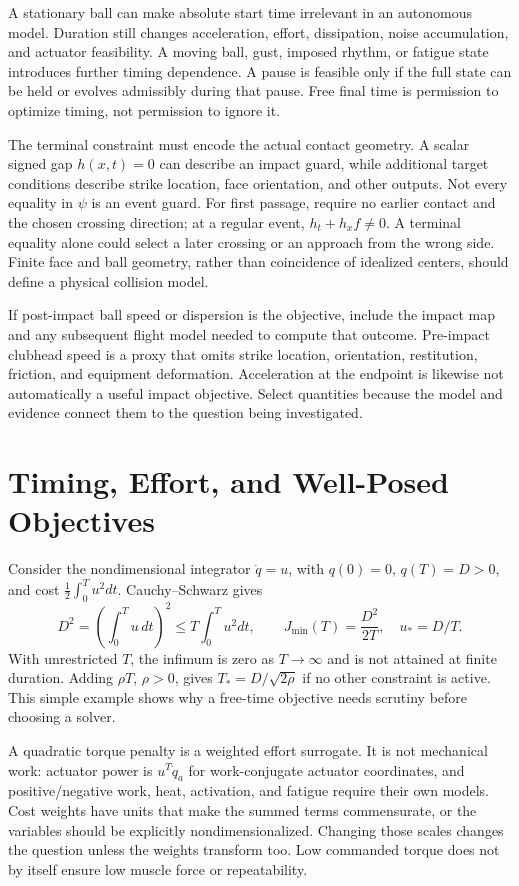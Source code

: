 \documentclass[12pt, openany]{book}
\theoremstyle{plain}
\begin{document}
A stationary ball can make absolute start time irrelevant in an autonomous
model. Duration still changes acceleration, effort, dissipation, noise
accumulation, and actuator feasibility. A moving ball, gust, imposed rhythm,
or fatigue state introduces further timing dependence. A pause is feasible
only if the full state can be held or evolves admissibly during that pause.
Free final time is permission to optimize timing, not permission to ignore it.

The terminal constraint must encode the actual contact geometry. A scalar
signed gap $h(x,t)=0$ can describe an impact guard, while additional target
conditions describe strike location, face orientation, and other outputs.
Not every equality in $\psi$ is an event guard. For first passage, require
no earlier contact and the chosen crossing direction; at a regular event,
$h_t+h_xf\ne0$. A terminal equality alone could select a later crossing or
an approach from the wrong side. Finite face and ball geometry, rather than
coincidence of idealized centers, should define a physical collision model.

If post-impact ball speed or dispersion is the objective, include the impact
map and any subsequent flight model needed to compute that outcome. Pre-impact
clubhead speed is a proxy that omits strike location, orientation, restitution,
friction, and equipment deformation. Acceleration at the endpoint is likewise
not automatically a useful impact objective. Select quantities because the
model and evidence connect them to the question being investigated.

\section{Timing, Effort, and Well-Posed Objectives}

Consider the nondimensional integrator $\dot q=u$, with $q(0)=0$, $q(T)=D>0$,
and cost $\tfrac12\int_0^T u^2dt$. Cauchy--Schwarz gives
\begin{equation}\label{eq:free_time_effort}
 D^2=\left(\int_0^T u\,dt\right)^2
 \leq T\int_0^T u^2dt,\qquad
 J_{\min}(T)=\frac{D^2}{2T},\quad u_*=D/T.
\end{equation}
With unrestricted $T$, the infimum is zero as $T\to\infty$ and is not attained
at finite duration. Adding $\rho T$, $\rho>0$, gives
$T_*=D/\sqrt{2\rho}$ if no other constraint is active. This simple example
shows why a free-time objective needs scrutiny before choosing a solver.

A quadratic torque penalty is a weighted effort surrogate. It is not
mechanical work: actuator power is $u^T\dot q_a$ for work-conjugate actuator
coordinates, and positive/negative work, heat, activation, and fatigue require
their own models. Cost weights have units that make the summed terms
commensurate, or the variables should be explicitly nondimensionalized.
Changing those scales changes the question unless the weights transform too.
Low commanded torque does not by itself ensure low muscle force or repeatability.
\end{document}
